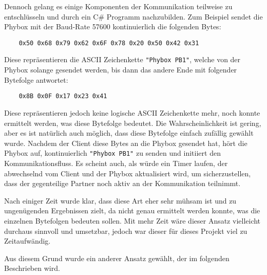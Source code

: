 \clearpage

Dennoch gelang es einige Komponenten der Kommunikation teilweise zu entschlüsseln und durch ein C\# Programm nachzubilden.
Zum Beispiel sendet die Phybox mit der Baud-Rate \textsc{57600} kontinuierlich die folgenden Bytes:

\begin{verbatim}
    0x50 0x68 0x79 0x62 0x6F 0x78 0x20 0x50 0x42 0x31
\end{verbatim}

Diese repräsentieren die ASCII Zeichenkette \texttt{"Phybox PB1"}, welche von der Phybox solange gesendet werden, bis dann das andere Ende mit folgender Bytefolge antwortet:

\begin{verbatim}
    0x8B 0x0F 0x17 0x23 0x41
\end{verbatim}

Diese repräsentieren jedoch keine logische ASCII Zeichenkette mehr, noch konnte ermittelt werden, was diese Bytefolge bedeutet. Die Wahrscheinlichkeit ist gering, aber es ist natürlich auch möglich, dass diese Bytefolge einfach zufällig gewählt wurde. Nachdem der Client diese Bytes an die Phybox gesendet hat, hört die Phybox auf, kontinuierlich \texttt{"Phybox PB1"} zu senden und initiiert den Kommunikationsfluss.
Es scheint auch, als würde ein Timer laufen, der abwechselnd vom Client und der Phybox aktualisiert wird, um  sicherzustellen, dass der gegenteilige Partner noch aktiv an der Kommunikation teilnimmt.

Nach einiger Zeit wurde klar, dass diese Art eher sehr mühsam ist und zu ungenügenden Ergebnissen zielt, da nicht genau ermittelt werden konnte, was die einzelnen Bytefolgen bedeuten sollen. Mit mehr Zeit wäre dieser Ansatz vielleicht durchaus sinnvoll und umsetzbar, jedoch war dieser für dieses Projekt viel zu Zeitaufwändig.

Aus diesem Grund wurde ein anderer Ansatz gewählt, der im folgenden Beschrieben wird.
